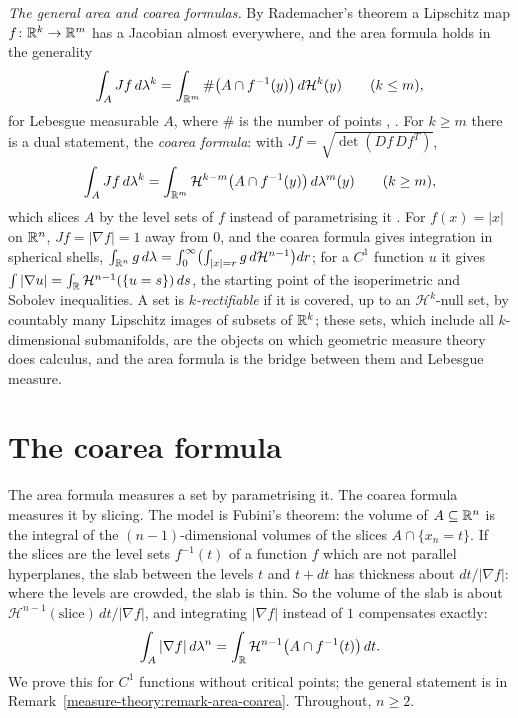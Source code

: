 \begin{remark}\label{measure-theory:remark-area-coarea}
\emph{The general area and coarea formulas.} By Rademacher's theorem a Lipschitz map $f \colon \mathbb{R}^k \to \mathbb{R}^m$ has a Jacobian almost everywhere, and the area formula holds in the generality
\[
\int_AJf\,d\lambda^k = \int_{\mathbb{R}^m}\#\bigl(A \cap f^{-1}(y)\bigr)\,d\mathcal{H}^k(y) \qquad (k \leq m),
\]
for Lebesgue measurable $A$, where $\#$ is the number of points \cite[Section 3.3]{evans-gariepy}, \cite[Section 3.2]{federer-gmt}. For $k \geq m$ there is a dual statement, the \emph{coarea
formula}: with $Jf = \sqrt{\det(Df\,Df^T)}$,
\[
\int_AJf\,d\lambda^k = \int_{\mathbb{R}^m}\mathcal{H}^{k-m}\bigl(A \cap f^{-1}(y)\bigr)\,d\lambda^m(y) \qquad (k \geq m),
\]
which slices $A$ by the level sets of $f$ instead of parametrising it \cite[Section 3.4]{evans-gariepy}. For $f(x) = |x|$ on $\mathbb{R}^n$, $Jf = |\nabla f| = 1$ away from $0$, and the coarea formula
gives integration in spherical shells, $\int_{\mathbb{R}^n}g\,d\lambda = \int_0^\infty\bigl(\int_{|x| = r}g\,d\mathcal{H}^{n-1}\bigr)dr$; for a $C^1$ function $u$ it gives $\int|\nabla u| =
\int_{\mathbb{R}}\mathcal{H}^{n-1}(\{u = s\})\,ds$, the starting point of the isoperimetric and Sobolev inequalities. A set is \emph{$k$-rectifiable} if it is covered, up to an $\mathcal{H}^k$-null set,
by countably many Lipschitz images of subsets of $\mathbb{R}^k$; these sets, which include all $k$-dimensional submanifolds, are the objects on which geometric measure theory does calculus, and
the area formula is the bridge between them and Lebesgue measure.
\end{remark}

\section{The coarea formula}\label{measure-theory:section-coarea}

The area formula measures a set by parametrising it. The coarea formula measures it by slicing. The model is Fubini's theorem: the volume of $A \subseteq \mathbb{R}^n$ is the integral of the
$(n-1)$-dimensional volumes of the slices $A \cap \{x_n = t\}$. If the slices are the level sets $f^{-1}(t)$ of a function $f$ which are not parallel hyperplanes, the slab between the levels $t$ and
$t + dt$ has thickness about $dt/|\nabla f|$: where the levels are crowded, the slab is thin. So the volume of the slab is about $\mathcal{H}^{n-1}(\text{slice})\,dt/|\nabla f|$, and integrating
$|\nabla f|$ instead of $1$ compensates exactly:
\[
\int_A|\nabla f|\,d\lambda^n = \int_{\mathbb{R}}\mathcal{H}^{n-1}\bigl(A \cap f^{-1}(t)\bigr)\,dt .
\]
We prove this for $C^1$ functions without critical points; the general statement is in Remark~\ref{measure-theory:remark-area-coarea}. Throughout, $n \geq 2$.

